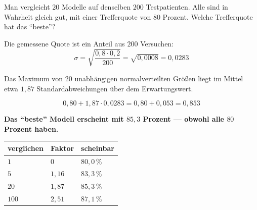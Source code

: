 \begin{aufgabe}
Man vergleicht $20$ Modelle auf denselben $200$ Testpatienten. Alle sind in Wahrheit gleich gut, mit einer Trefferquote von $80$ Prozent. Welche Trefferquote hat das \enquote{beste}?

\loesung
{}
Die gemessene Quote ist ein Anteil aus $200$ Versuchen:
\[ \sigma = \sqrt{\frac{0{,}8\cdot0{,}2}{200}} = \sqrt{0{,}0008} = 0{,}0283 \]

Das Maximum von $20$ unabhängigen normalverteilten Größen liegt im Mittel etwa $1{,}87$ Standardabweichungen über dem Erwartungswert.


\[ 0{,}80 + 1{,}87\cdot0{,}0283 = 0{,}80 + 0{,}053 = 0{,}853 \]

\begin{center}
\begin{minipage}{0.9\textwidth}
\textbf{Das \enquote{beste} Modell erscheint mit $85{,}3$ Prozent --- obwohl alle $80$ Prozent haben.}
\end{minipage}
\end{center}

\begin{center}
{\small
\renewcommand{\arraystretch}{1.5}
\begin{tabular}{@{}P{2.8cm}P{2.2cm}P{2.6cm}@{}}
\toprule
\textbf{verglichen} & \textbf{Faktor} & \textbf{scheinbar}\\
\midrule
$1$ & $0$ & $80{,}0\,\%$\\
$5$ & $1{,}16$ & $83{,}3\,\%$\\
$20$ & $1{,}87$ & $85{,}3\,\%$\\
$100$ & $2{,}51$ & $87{,}1\,\%$\\
\bottomrule
\end{tabular}}
\end{center}

\begin{center}
\begin{minipage}{0.88\textwidth}
\end{minipage}
\end{center}
\end{aufgabe}

